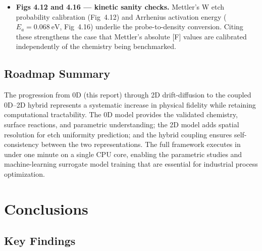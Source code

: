 \documentclass[11pt,a4paper]{report}
\begin{document}
\begin{itemize}[nosep]
\item \textbf{Figs 4.12 and 4.16 --- kinetic sanity checks.}  Mettler's W etch probability calibration (Fig~4.12) and Arrhenius activation energy ($E_a = \SI{0.068}{\electronvolt}$, Fig~4.16) underlie the probe-to-density conversion.  Citing these strengthens the case that Mettler's absolute [F] values are calibrated independently of the chemistry being benchmarked.
\end{itemize}

\section{Roadmap Summary}
\label{sec:future_roadmap}

The progression from 0D (this report) through 2D drift-diffusion to the coupled 0D--2D hybrid represents a systematic increase in physical fidelity while retaining computational tractability.  The 0D model provides the validated chemistry, surface reactions, and parametric understanding; the 2D model adds spatial resolution for etch uniformity prediction; and the hybrid coupling ensures self-consistency between the two representations.  The full framework executes in under one minute on a single CPU core, enabling the parametric studies and machine-learning surrogate model training that are essential for industrial process optimization.


\chapter{Conclusions}
\label{ch:conclusions}

\section{Key Findings}
\label{sec:conc_findings}
\end{document}
